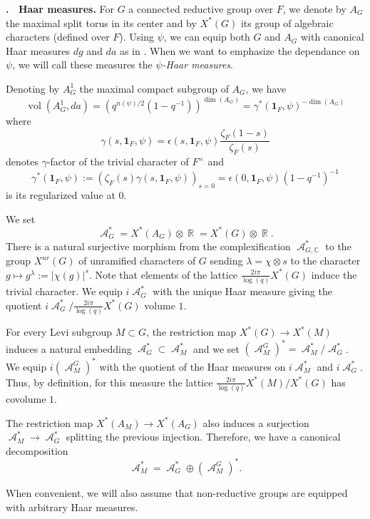 \documentclass[12pt]{article}
\newenvironment{paragr}[1][]{\refstepcounter{subsubsection} \noindent \textbf{\thesubsubsection . \ #1}}{\medskip}
\numberwithin{equation}{section}
\def\bC{\mathbb{C}}
\DeclareMathOperator{\vol}{vol}
\DeclareMathOperator{\cA}{\mathcal{A}}
\DeclareMathOperator{\bR}{\mathbb{R}}
\begin{document}
	\begin{paragr}[Haar measures.]\label{S measures}
		For $G$ a connected reductive group over $F$, we denote by $A_G$ the maximal split torus in its center and by $X^*(G)$ its group of algebraic characters (defined over $F$). Using $\psi$, we can equip both $G$ and $A_G$ with canonical Haar measures $dg$ and $da$ as in \cite[\S 2.5]{BPPlanch}. When we want to emphasize the dependance on $\psi$, we will call these measures the {\em $\psi$-Haar measures}. 
		
		Denoting by $A_G^1$ the maximal compact subgroup of $A_G$, we have
		$$\displaystyle \vol(A_G^1,da)=\left(q^{n(\psi)/2}(1-q^{-1})\right)^{\dim(A_G)}=\gamma^*(\mathbf{1}_F,\psi)^{-\dim(A_G)}$$
		where
		$$\displaystyle \gamma(s,\mathbf{1}_F,\psi)=\epsilon(s,\mathbf{1}_F,\psi)\frac{\zeta_F(1-s)}{\zeta_F(s)}$$
		denotes $\gamma$-factor of the trivial character of $F^\times$ and
		$$\displaystyle \gamma^*(\mathbf{1}_F,\psi):=\left(\zeta_F(s) \gamma(s,\mathbf{1}_F,\psi)\right)_{s=0}=\epsilon(0,\mathbf{1}_F,\psi)(1-q^{-1})^{-1}$$
		is its regularized value at $0$.
		
		We set
		$$\displaystyle \cA_G^*=X^*(A_G)\otimes \bR=X^*(G)\otimes \bR.$$
		There is a natural surjective morphism from the complexification $\cA_{G,\bC}^*$ to the group $X^{ur}(G)$ of unramified characters of $G$ sending $\lambda=\chi\otimes s$ to the character $g\mapsto g^\lambda:=\lvert \chi(g)\rvert^s$. Note that elements of the lattice $\frac{2i\pi}{\log(q)}X^*(G)$ induce the trivial character. We equip $i\cA_G^*$ with the unique Haar measure giving the quotient $i\cA_G^*/\frac{2i\pi}{\log(q)}X^*(G)$ volume $1$.
		
		For every Levi subgroup $M\subset G$, the restriction map $X^*(G)\to X^*(M)$ induces a natural embedding $\cA_G^*\subset \cA_M^*$ and we set $(\cA_M^G)^*=\cA_M^*/\cA_G^*$. We equip $i(\cA_M^G)^*$ with the quotient of the Haar measures on $i\cA_M^*$ and $i\cA_G^*$. Thus, by definition, for this measure the lattice $\frac{2i\pi}{\log(q)} X^*(M)/X^*(G)$ has covolume $1$.
		
		The restriction map $X^*(A_M)\to X^*(A_G)$ also induces a surjection $\cA_M^*\to \cA_G^*$ splitting the previous injection. Therefore, we have a canonical decomposition
		$$\displaystyle \cA_M^*=\cA_G^*\oplus (\cA_M^G)^*.$$
		
		
		When convenient, we will also assume that non-reductive groups are equipped with arbitrary Haar measures.
	\end{paragr}
	
\end{document}
